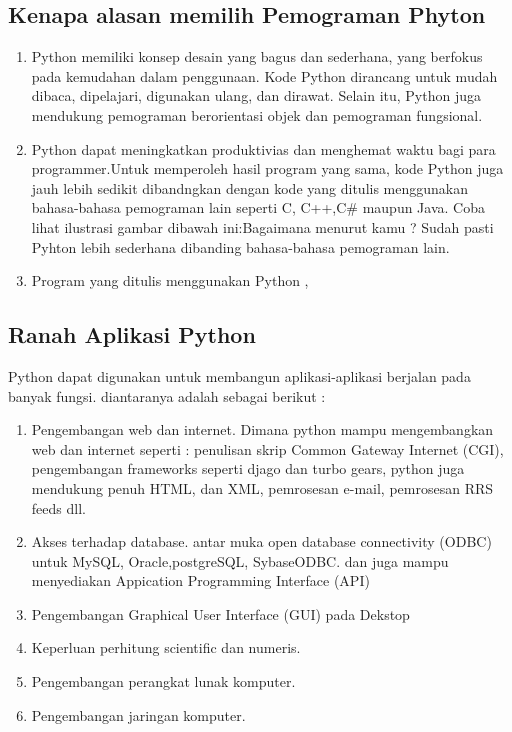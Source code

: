 \subsection{Kenapa alasan memilih Pemograman Phyton}
\begin{enumerate}
\item Python memiliki konsep desain yang bagus dan sederhana, yang berfokus pada kemudahan dalam penggunaan. Kode Python dirancang untuk mudah dibaca, dipelajari, digunakan ulang, dan dirawat. Selain itu, Python juga mendukung pemograman berorientasi objek dan pemograman fungsional.
\item Python dapat meningkatkan produktivias dan menghemat waktu bagi para programmer.Untuk memperoleh hasil program yang sama, kode Python juga jauh lebih sedikit dibandngkan dengan kode yang ditulis menggunakan bahasa-bahasa pemograman lain seperti C, C++,C# maupun Java. Coba lihat ilustrasi gambar dibawah ini:Bagaimana menurut kamu ? Sudah pasti Pyhton lebih sederhana dibanding bahasa-bahasa pemograman lain.
\item Program yang ditulis menggunakan Python ,
\end{enumerate}

\subsection{Ranah Aplikasi Python}
Python dapat digunakan untuk membangun aplikasi-aplikasi berjalan pada banyak fungsi. diantaranya adalah sebagai berikut :
\begin{enumerate}
\item Pengembangan web dan internet. Dimana python mampu mengembangkan web dan internet seperti : penulisan skrip Common Gateway Internet (CGI), pengembangan frameworks seperti djago dan turbo gears, python juga mendukung penuh HTML, dan XML, pemrosesan e-mail, pemrosesan RRS feeds dll.
\item Akses terhadap database. antar muka open database connectivity (ODBC) untuk MySQL, Oracle,postgreSQL, SybaseODBC. dan juga mampu menyediakan Appication Programming Interface (API)
\item Pengembangan Graphical User Interface (GUI) pada Dekstop
\item Keperluan perhitung scientific dan numeris.
\item Pengembangan perangkat lunak komputer.
\item Pengembangan jaringan komputer.
\end{enumerate}

